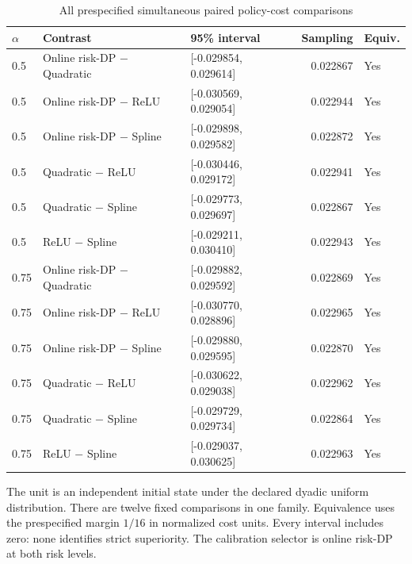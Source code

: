 \begin{table}[htbp]
\caption{All prespecified simultaneous paired policy-cost comparisons}\label{tab:pairs95}
\centering\small
\begin{tabular}{@{}lllrl@{}}
\toprule
$\alpha$ & Contrast & 95\% interval & Sampling & Equiv.\\\midrule
0.5 & Online risk-DP $-$ Quadratic & [-0.029854, 0.029614] & 0.022867 & Yes\\
0.5 & Online risk-DP $-$ ReLU & [-0.030569, 0.029054] & 0.022944 & Yes\\
0.5 & Online risk-DP $-$ Spline & [-0.029898, 0.029582] & 0.022872 & Yes\\
0.5 & Quadratic $-$ ReLU & [-0.030446, 0.029172] & 0.022941 & Yes\\
0.5 & Quadratic $-$ Spline & [-0.029773, 0.029697] & 0.022867 & Yes\\
0.5 & ReLU $-$ Spline & [-0.029211, 0.030410] & 0.022943 & Yes\\
0.75 & Online risk-DP $-$ Quadratic & [-0.029882, 0.029592] & 0.022869 & Yes\\
0.75 & Online risk-DP $-$ ReLU & [-0.030770, 0.028896] & 0.022965 & Yes\\
0.75 & Online risk-DP $-$ Spline & [-0.029880, 0.029595] & 0.022870 & Yes\\
0.75 & Quadratic $-$ ReLU & [-0.030622, 0.029038] & 0.022962 & Yes\\
0.75 & Quadratic $-$ Spline & [-0.029729, 0.029734] & 0.022864 & Yes\\
0.75 & ReLU $-$ Spline & [-0.029037, 0.030625] & 0.022963 & Yes\\
\bottomrule
\end{tabular}
\par\smallskip\begin{minipage}{.98\linewidth}\footnotesize The unit is an independent initial state under the declared dyadic uniform distribution. There are twelve fixed comparisons in one family. Equivalence uses the prespecified margin $1/16$ in normalized cost units. Every interval includes zero: none identifies strict superiority. The calibration selector is online risk-DP at both risk levels.\end{minipage}
\end{table}

